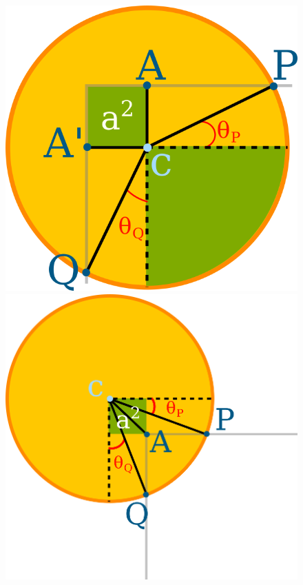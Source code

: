 \begin{figure}[h!]
	\begin{minipage}{0.5\textwidth}
	\center
	\includegraphics[scale=2.0]{figures/appendix-potential-elastica/balance-dev-1.png}
	\end{minipage}%
	\begin{minipage}{0.5\textwidth}
	\center
	\includegraphics[scale=2.0]{figures/appendix-potential-elastica/balance-dev-2.png}
	\end{minipage}	
\end{figure}
